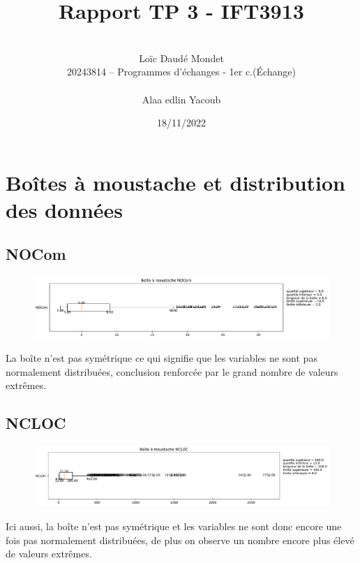 \documentclass[11pt]{rapport-tp-qlm}
\begin{document}
\title{Rapport TP 3 - IFT3913}

\author{
	\\Loïc Daudé Mondet
	\\20243814 -- Programmes d'échanges - 1er c.(Échange)
	\\
	\\Alaa edlin Yacoub
}

\date{18/11/2022}

\maketitle

\chapter{Boîtes à moustache et distribution des données}
    \section{NOCom}
    \begin{figure}[h]
    \includegraphics[scale=0.5]{assets/moustache_NOCom}
    \centering
    \end{figure}
    La boîte n'est pas symétrique ce qui signifie que les variables ne sont pas normalement distribuées, conclusion renforcée par le grand nombre de valeurs extrêmes.
    \section{NCLOC}
    \begin{figure}[h]
    \includegraphics[scale=0.5]{assets/moustache_NCLOC}
    \centering
    \end{figure}
       Ici aussi, la boîte n'est pas symétrique et les variables ne sont donc encore une fois pas normalement distribuées, de plus on observe un nombre encore plus élevé de valeurs extrêmes. 
     \newpage
\end{document}
